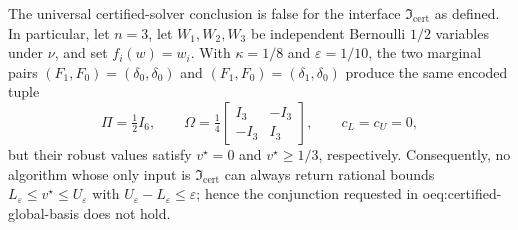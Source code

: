 The universal certified-solver conclusion is false for the interface \(\mathfrak I_{\mathrm{cert}}\) as defined.  In particular, let \(n=3\), let \(W_1,W_2,W_3\) be independent Bernoulli \(1/2\) variables under \(\nu\), and set \(f_i(w)=w_i\).  With \(\kappa=1/8\) and \(\varepsilon=1/10\), the two marginal pairs \((F_1,F_0)=(\delta_0,\delta_0)\) and \((F_1,F_0)=(\delta_1,\delta_0)\) produce the same encoded tuple
\[
\Pi=\tfrac12 I_6,\qquad
\Omega=\tfrac14\begin{bmatrix}I_3&-I_3\\-I_3&I_3\end{bmatrix},
\qquad c_L=c_U=0,
\]
but their robust values satisfy \(v^\star=0\) and \(v^\star\ge1/3\), respectively.  Consequently, no algorithm whose only input is \(\mathfrak I_{\mathrm{cert}}\) can always return rational bounds \(L_{\varepsilon}\le v^\star\le U_{\varepsilon}\) with \(U_{\varepsilon}-L_{\varepsilon}\le\varepsilon\); hence the conjunction requested in oeq:certified-global-basis does not hold.
